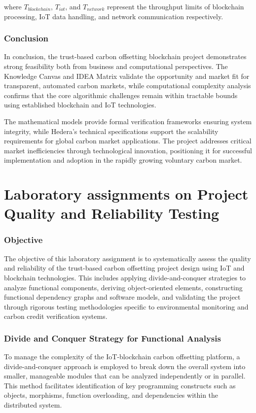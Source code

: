 \documentclass[oneside,a4paper,12pt]{book}
\begin{document}
\begin{appendices}
where $T_{blockchain}$, $T_{iot}$, and $T_{network}$ represent the throughput limits of blockchain processing, IoT data handling, and network communication respectively.

\subsection{Conclusion}
In conclusion, the trust-based carbon offsetting blockchain project demonstrates strong feasibility both from business and computational perspectives. The Knowledge Canvas and IDEA Matrix validate the opportunity and market fit for transparent, automated carbon markets, while computational complexity analysis confirms that the core algorithmic challenges remain within tractable bounds using established blockchain and IoT technologies.

The mathematical models provide formal verification frameworks ensuring system integrity, while Hedera's technical specifications support the scalability requirements for global carbon market applications. The project addresses critical market inefficiencies through technological innovation, positioning it for successful implementation and adoption in the rapidly growing voluntary carbon market.


\chapter{Laboratory assignments on Project Quality and Reliability Testing}

\subsection{Objective}
The objective of this laboratory assignment is to systematically assess the quality and reliability of the trust-based carbon offsetting project design using IoT and blockchain technologies. This includes applying divide-and-conquer strategies to analyze functional components, deriving object-oriented elements, constructing functional dependency graphs and software models, and validating the project through rigorous testing methodologies specific to environmental monitoring and carbon credit verification systems.

\subsection{Divide and Conquer Strategy for Functional Analysis}
To manage the complexity of the IoT-blockchain carbon offsetting platform, a divide-and-conquer approach is employed to break down the overall system into smaller, manageable modules that can be analyzed independently or in parallel. This method facilitates identification of key programming constructs such as objects, morphisms, function overloading, and dependencies within the distributed system.


\end{appendices}
\end{document}
